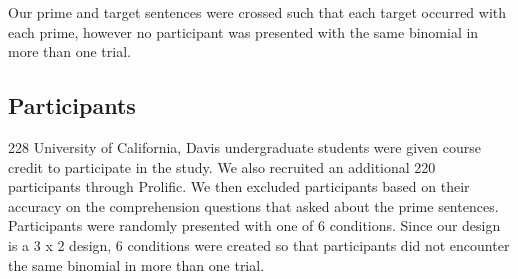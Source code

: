 \documentclass[
  12pt,
]{scrartcl}
\begin{document}
\begin{table}

\caption{\label{tbl-conditionslist}A table of our conditions.}


\end{table}%

Our prime and target sentences were crossed such that each target
occurred with each prime, however no participant was presented with the
same binomial in more than one trial.

\subsection{Participants}\label{participants}

228 University of California, Davis undergraduate students were given
course credit to participate in the study. We also recruited an
additional 220 participants through Prolific. We then excluded
participants based on their accuracy on the comprehension questions that
asked about the prime sentences. Participants were randomly presented
with one of 6 conditions. Since our design is a 3 x 2 design, 6
conditions were created so that participants did not encounter the same
binomial in more than one trial.
\end{document}
